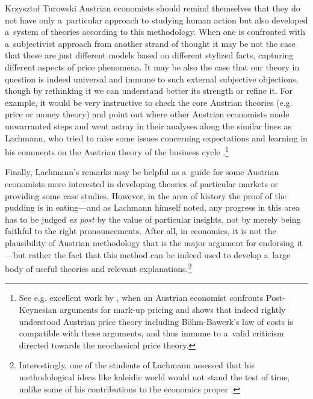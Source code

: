 \begin{artengenv}{Krzysztof Turowski}
Austrian economists should remind themselves that they do not have only a~particular approach to studying human action but also developed a~system of theories according to this methodology.
When one is confronted with a~subjectivist approach from another strand of thought it may be not the case that these are just different models based on different stylized facts, capturing different aspects of price phenomena.
It may be also the case that our theory in question is indeed universal and immune to such external subjective objections, though by rethinking it we can understand better its strength or refine it. For example, it would be very instructive to check the core Austrian theories (e.g. price or money theory) and point out where other Austrian economists made unwarranted steps and went astray in their analyses along the similar lines as Lachmann, who tried to raise some issues concerning expectations and learning in his comments on the Austrian theory of the business cycle \parencite[123--124]{lachmann-expectations}.\footnote{See e.g. excellent work by \textcite{machaj-postkeynesian}, when an Austrian economist confronts Post-Keynesian arguments for mark-up pricing and shows that indeed rightly understood Austrian price theory including B\"ohm-Bawerk's law of costs is compatible with these arguments, and thus immune to a~valid criticism directed towards the neoclassical price theory.}

Finally, Lachmann's remarks may be helpful as a~guide for some Austrian economists more interested in developing theories of particular markets or providing some case studies.
However, in the area of history the proof of the pudding is in eating---and as Lachmann himself noted, any progress in this area has to be judged \emph{ex post} by the value of particular insights, not by merely being faithful to the right pronouncements.
After all, in economics, it is not the plausibility of Austrian methodology that is the major argument for endorsing it---but rather the fact that this method can be indeed used to develop a~large body of useful theories and relevant explanations.\footnote{Interestingly, one of the students of Lachmann assessed that his methodological ideas like kaleidic world would not stand the test of time, unlike some of his contributions to the economics proper \parencite[388]{boehm2000professor}.}








\end{artengenv}

\label{turowski-last}